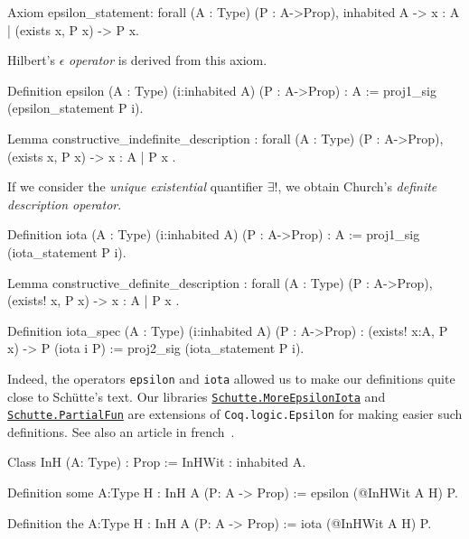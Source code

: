 \begin{Coqsrc}
Axiom epsilon_statement:
  forall (A : Type) (P : A->Prop), inhabited A ->
    {x : A | (exists x, P x) -> P x}.
\end{Coqsrc}

Hilbert's $\epsilon$ \emph{operator} is derived from this  axiom.

\begin{Coqsrc}
  Definition epsilon (A : Type) (i:inhabited A) (P : A->Prop) : A
  := proj1_sig (epsilon_statement P i).

Lemma constructive_indefinite_description :
  forall (A : Type) (P : A->Prop),
    (exists x, P x) -> { x : A | P x }.
\end{Coqsrc}




If we consider the \emph{unique existential} quantifier $\exists!$, we obtain
Church's \emph{definite description operator}.

\begin{Coqsrc}
Definition iota (A : Type) (i:inhabited A) (P : A->Prop) : A
  := proj1_sig (iota_statement P i).
\end{Coqsrc}


\begin{Coqsrc}
 Lemma constructive_definite_description :
  forall (A : Type) (P : A->Prop),
    (exists! x, P x) -> { x : A | P x }.
\end{Coqsrc}


\begin{Coqsrc}
Definition iota_spec (A : Type) (i:inhabited A) (P : A->Prop) :
  (exists! x:A, P x) -> P (iota i P)
  := proj2_sig (iota_statement P i).
\end{Coqsrc}



Indeed, the operators \texttt{epsilon} and \texttt{iota} allowed us to make our definitions 
quite close to Schütte's text. Our libraries \href{../src/html/hydras.Schutte.MoreEpsilonIota.html}%
{\texttt{Schutte.MoreEpsilonIota}}
and
\href{../src/html/hydras.Schutte.PartialFun.html}%
{\texttt{Schutte.PartialFun}} are extensions of \texttt{Coq.logic.Epsilon} for making easier 
such definitions. See also an article in french~\cite{PCiota}. 


\begin{Coqsrc}
Class InH (A: Type) : Prop :=
   InHWit : inhabited A.

Definition some {A:Type} {H : InH A} (P: A -> Prop) := 
   epsilon (@InHWit A H) P.

Definition the {A:Type} {H : InH A} (P: A -> Prop) := 
   iota (@InHWit A H) P.
\end{Coqsrc}

